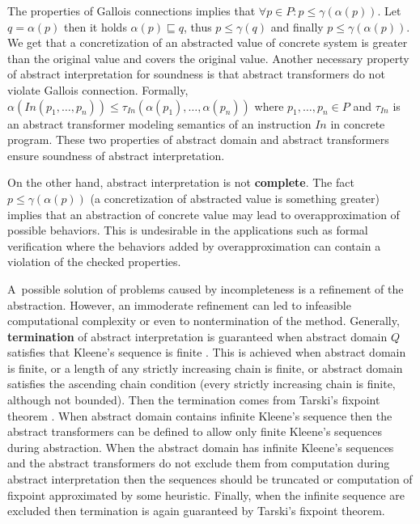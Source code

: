 \documentclass[a4paper, 12pt]{article}
\newcommand{\aord}[0]{\sqsubseteq}
\newcommand{\cord}[0]{\leq}
\newcommand{\adom}[0]{Q}
\newcommand{\aitem}[0]{q}
\newcommand{\cdom}[0]{P}
\newcommand{\citem}[0]{p}
\newcommand{\atrans}[0]{\tau}
\newcommand{\afun}[0]{\alpha}
\newcommand{\cfun}[0]{\gamma}
\begin{document}
The properties of Gallois connections implies that
$\forall \citem \in \cdom: \citem \cord \cfun(\afun(\citem))$.
Let $q = \afun(\citem)$ then it holds $\alpha(\citem) \aord \aitem$,
thus $\citem \cord \cfun(\aitem)$ and finally $\citem \cord \cfun(\afun(\citem))$.
We get that a concretization of an abstracted value of concrete system
is greater than the original value and covers the original value.
Another necessary property of abstract interpretation for soundness is
that abstract transformers do not violate Gallois connection.
Formally, $\alpha(In(\citem_1,\ldots,\citem_n)) \cord \atrans_{In}(\alpha(\citem_1),\ldots, \alpha(\citem_n))$
where $\citem_1,\ldots,\citem_n \in \cdom$ and $\atrans_{In}$ is an abstract transformer
modeling semantics of an instruction $In$ in concrete program.
These two properties of abstract domain and abstract transformers ensure
soundness of abstract interpretation.

On the other hand, abstract interpretation is not \textbf{complete}.
The fact $\citem \cord \cfun(\afun(\citem))$ (a concretization of abstracted value
is something greater) implies that an abstraction of concrete value may lead
to overapproximation of possible behaviors.
This is undesirable in the applications such as formal verification
where the behaviors added by overapproximation can contain
a violation of the checked properties.

A~possible solution of problems caused by incompleteness is a refinement of the abstraction.
However, an immoderate refinement can led to infeasible computational complexity
or even to nontermination of the method.
Generally, \textbf{termination} of abstract interpretation is guaranteed
when abstract domain $\adom$ satisfies that Kleene's sequence is finite \cite{popl77}.
This is achieved when abstract domain is finite, or a length of any strictly
increasing chain is finite, or abstract domain satisfies the ascending chain
condition (every strictly increasing chain is finite, although not bounded).
Then the termination comes from Tarski's fixpoint theorem \cite{tarski}.
When abstract domain contains infinite Kleene's sequence
then the abstract transformers can be defined to allow only finite
Kleene's sequences during abstraction.
When the abstract domain has infinite Kleene's sequences and
the abstract transformers do not exclude them from computation during abstract
interpretation then the sequences should be truncated or computation
of fixpoint approximated by some heuristic.
Finally, when the infinite sequence are excluded then termination is
again guaranteed by Tarski's fixpoint theorem.
\end{document}
